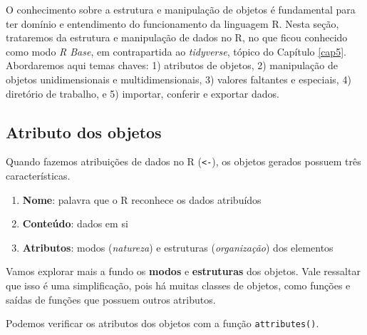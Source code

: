 \documentclass[
]{book}
\newenvironment{Shaded}{\begin{snugshade}}{\end{snugshade}}
\newcommand{\CommentTok}[1]{\textcolor[rgb]{0.37,0.37,0.37}{\textit{#1}}}
\newcommand{\DocumentationTok}[1]{\textcolor[rgb]{0.37,0.37,0.37}{\textbf{\textit{#1}}}}
\newcommand{\FunctionTok}[1]{\textcolor[rgb]{0,0,0}{#1}}
\newcommand{\NormalTok}[1]{#1}
\providecommand{\tightlist}{%
  \setlength{\itemsep}{0pt}\setlength{\parskip}{0pt}}
\begin{document}
O conhecimento sobre a estrutura e manipulação de objetos é fundamental para ter domínio e entendimento do funcionamento da linguagem R. Nesta seção, trataremos da estrutura e manipulação de dados no R, no que ficou conhecido como modo \emph{R Base}, em contrapartida ao \emph{tidyverse}, tópico do Capítulo \ref{cap5}. Abordaremos aqui temas chaves: 1) atributos de objetos, 2) manipulação de objetos unidimensionais e multidimensionais, 3) valores faltantes e especiais, 4) diretório de trabalho, e 5) importar, conferir e exportar dados.

\hypertarget{atributo-dos-objetos}{%
\subsection{Atributo dos objetos}\label{atributo-dos-objetos}}

Quando fazemos atribuições de dados no R (\texttt{\textless{}-}), os objetos gerados possuem três características.

\begin{enumerate}
\def\labelenumi{\arabic{enumi}.}
\tightlist
\item
  \textbf{Nome}: palavra que o R reconhece os dados atribuídos
\item
  \textbf{Conteúdo}: dados em si
\item
  \textbf{Atributos}: modos (\emph{natureza}) e estruturas (\emph{organização}) dos elementos
\end{enumerate}

Vamos explorar mais a fundo os \textbf{modos} e \textbf{estruturas} dos objetos. Vale ressaltar que isso é uma simplificação, pois há muitas classes de objetos, como funções e saídas de funções que possuem outros atributos.

Podemos verificar os atributos dos objetos com a função \texttt{attributes()}.

\begin{Shaded}
\end{Shaded}
\end{document}
